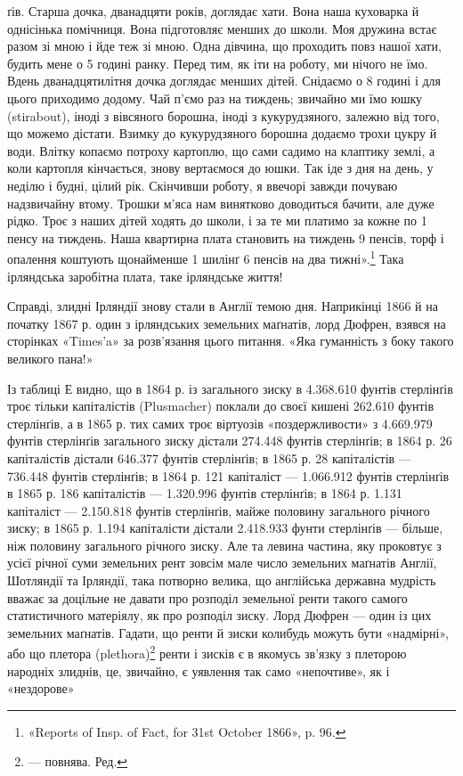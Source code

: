 ґів. Старша дочка, дванадцяти років, доглядає хати. Вона наша
куховарка й однісінька помічниця. Вона підготовляє менших
до школи. Моя дружина встає разом зі мною і йде теж зі мною.
Одна дівчина, що проходить повз нашої хати, будить мене о 5
годині ранку. Перед тим, як іти на роботу, ми нічого не їмо.
Вдень дванадцятилітня дочка доглядає менших дітей. Снідаємо
о 8 годині і для цього приходимо додому. Чай п’ємо раз на тиждень;
звичайно ми їмо юшку (stirabout), іноді з вівсяного борошна,
іноді з кукурудзяного, залежно від того, що можемо дістати.
Взимку до кукурудзяного борошна додаємо трохи цукру й води.
Влітку копаємо потроху картоплю, що сами садимо на клаптику
землі, а коли картопля кінчається, знову вертаємося до юшки.
Так іде з дня на день, у неділю і будні, цілий рік. Скінчивши
роботу, я ввечорі завжди почуваю надзвичайну втому. Трошки
м’яса нам винятково доводиться бачити, але дуже рідко. Троє
з наших дітей ходять до школи, і за те ми платимо за кожне по
1 пенсу на тиждень. Наша квартирна плата становить на тиждень
9 пенсів, торф і опалення коштують щонайменше 1 шилінґ 6 пенсів
на два тижні».\footnote{
«Reports of Insp. of Fact, for 31st October 1866», p. 96.
} Така ірляндська заробітна плата, таке
ірляндське життя!

Справді, злидні Ірляндії знову стали в Англії темою дня.
Наприкінці 1866 й на початку 1867 р. один з ірляндських земельних
маґнатів, лорд Дюфрен, взявся на сторінках «Times’a» за
розв’язання цього питання. «Яка гуманність з боку такого великого
пана!»

Із таблиці Е видно, що в 1864 р. із загального зиску в 4.368.610
фунтів стерлінґів троє тільки капіталістів (Plusmacher) поклали до
своєї кишені 262.610 фунтів стерлінґів, а в 1865 р. тих самих троє
віртуозів «поздержливости» з 4.669.979 фунтів стерлінґів загального
зиску дістали 274.448 фунтів стерлінґів; в 1864 р. 26 капіталістів
дістали 646.377 фунтів стерлінґів; в 1865 р. 28 капіталістів —
736.448 фунтів стерлінґів; в 1864 р. 121 капіталіст — 1.066.912
фунтів стерлінґів в 1865 р. 186 капіталістів — 1.320.996 фунтів
стерлінґів; в 1864 р. 1.131 капіталіст — 2.150.818 фунтів стерлінґів,
майже половину загального річного зиску; в 1865 р.
1.194 капіталісти дістали 2.418.933 фунти стерлінґів — більше, ніж
половину загального річного зиску. Але та левина частина,
яку проковтує з усієї річної суми земельних рент зовсім мале
число земельних маґнатів Англії, Шотляндії та Ірляндії, така
потворно велика, що англійська державна мудрість вважає за
доцільне не давати про розподіл земельної ренти такого самого
статистичного матеріялу, як про розподіл зиску. Лорд Дюфрен
— один із цих земельних маґнатів. Гадати, що ренти й зиски
колибудь можуть бути «надмірні», або що плетора (plethora)\footnote*{
— повнява. Ред.
}
ренти і зисків є в якомусь зв’язку з плеторою народніх злиднів,
це, звичайно, є уявлення так само «непочтиве», як і «нездорове»